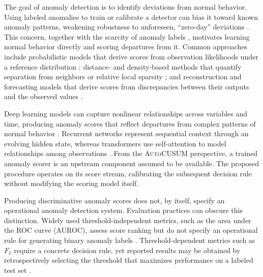 The goal of anomaly detection is to identify deviations from normal behavior. Using labeled anomalies to train or calibrate a detector can bias it toward known anomaly patterns, weakening robustness to unforeseen, ``zero-day'' deviations \cite{ruff_review_2021}. This concern, together with the scarcity of anomaly labels \cite{chandola_review}, motivates learning normal behavior directly and scoring departures from it. Common approaches include probabilistic models that derive scores from observation likelihoods under a reference distribution \cite{probabilistic_ad}; distance- and density-based methods that quantify separation from neighbors \cite{knn_ad} or relative local sparsity \cite{lof_ad}; and reconstruction and forecasting models that derive scores from discrepancies between their outputs and the observed values \cite{dl_tsad_review}.

Deep learning models can capture nonlinear relationships across variables and time, producing anomaly scores that reflect departures from complex patterns of normal behavior \cite{dl_tsad_review}. Recurrent networks represent sequential context through an evolving hidden state, whereas transformers use self-attention to model relationships among observations \cite{dl_tsad_review,attention}. From the \textsc{AutoCUSUM} perspective, a trained anomaly scorer is an upstream component assumed to be available. The proposed procedure operates on its score stream, calibrating the subsequent decision rule without modifying the scoring model itself.

Producing discriminative anomaly scores does not, by itself, specify an operational anomaly detection system. Evaluation practices can obscure this distinction. Widely used threshold-independent metrics, such as the area under the ROC curve (AUROC), assess score ranking but do not specify an operational rule for generating binary anomaly labels \cite{dl_tsad_review}. Threshold-dependent metrics such as $F_1$ require a concrete decision rule, yet reported results may be obtained by retrospectively selecting the threshold that maximizes performance on a labeled test set \cite{xu_bostrom_2026}.
